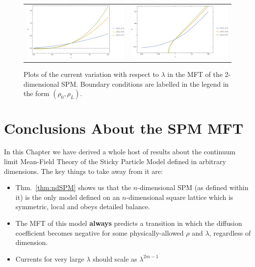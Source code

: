 \begin{figure}
\caption[$2$d SPM MFT current flow as a function of $\lambda$, with fixed boundaries.]{Plots of the current variation with respect to $\lambda$ in the MFT of the 2-dimensional SPM. Boundary conditions are labelled in the legend in the form $(\rho_0, \rho_L)$.} \label{fig:2dLambdaScans}
\begin{center}
 \begin{tabular}{c  c}
    \includegraphics[width=0.5\linewidth]{analytics/images/mftCurrent2d/current2d3BoundLin}  & \includegraphics[width=0.5\linewidth]{analytics/images/mftCurrent2d/current2d3BoundLog} \\
    \end{tabular}
\end{center}
    \vspace{-2em}
\end{figure}

\section{Conclusions About the SPM MFT}

In this Chapter we have derived a whole host of results about the continuum limit Mean-Field Theory
of the Sticky Particle Model defined in arbitrary dimensions. The key things to take away from it are:
\begin{itemize}
 \item Thm.~\ref{thm:ndSPM} shows us that the $n$-dimensional SPM (as defined within it) is the only
 model defined on an $n$-dimensional square lattice which is symmetric, local and obeys
 detailed balance.
 \item The MFT of this model \textbf{always} predicts a transition in which the diffusion coefficient
 becomes negative for some physically-allowed $\rho$ and $\lambda$, regardless of dimension.
 \item Currents for very large $\lambda$ should scale as $\lambda^{2m-1}$
\end{itemize}

